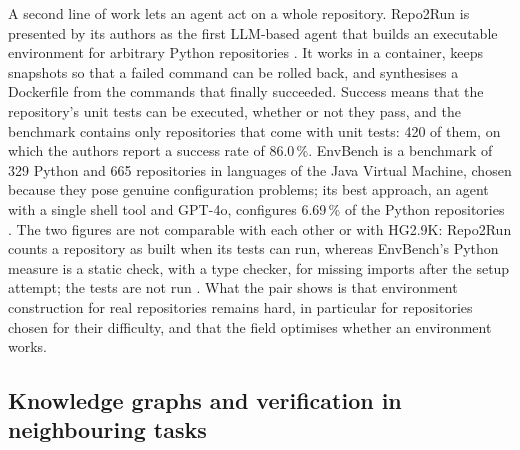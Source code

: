 A second line of work lets an agent act on a whole repository. Repo2Run is presented by its authors as the first \ac{LLM}-based agent that builds an executable environment for arbitrary Python repositories \cite{hu2025repo2run}. It works in a container, keeps snapshots so that a failed command can be rolled back, and synthesises a Dockerfile from the commands that finally succeeded. Success means that the repository's unit tests can be executed, whether or not they pass, and the benchmark contains only repositories that come with unit tests: 420 of them, on which the authors report a success rate of 86.0\,\%. EnvBench is a benchmark of 329 Python and 665 repositories in languages of the Java Virtual Machine, chosen because they pose genuine configuration problems; its best approach, an agent with a single shell tool and GPT-4o, configures 6.69\,\% of the Python repositories \cite{eliseeva2025envbench}.%
The two figures are not comparable with each other or with HG2.9K: Repo2Run counts a repository as built when its tests can run, whereas EnvBench's Python measure is a static check, with a type checker, for missing imports after the setup attempt; the tests are not run \cite{hu2025repo2run,eliseeva2025envbench}. What the pair shows is that environment construction for real repositories remains hard, in particular for repositories chosen for their difficulty, and that the field optimises whether an environment works.

\subsection{Knowledge graphs and verification in neighbouring tasks}

